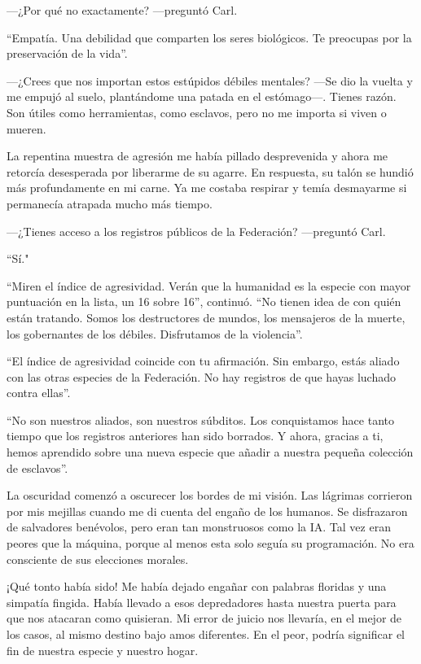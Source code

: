 —¿Por qué no exactamente? —preguntó Carl.

“Empatía. Una debilidad que comparten los seres biológicos. Te preocupas por la preservación de la vida”.

—¿Crees que nos importan estos estúpidos débiles mentales? —Se dio la vuelta y me empujó al suelo, plantándome una patada en el estómago—. Tienes razón. Son útiles como herramientas, como esclavos, pero no me importa si viven o mueren.

La repentina muestra de agresión me había pillado desprevenida y ahora me retorcía desesperada por liberarme de su agarre. En respuesta, su talón se hundió más profundamente en mi carne. Ya me costaba respirar y temía desmayarme si permanecía atrapada mucho más tiempo.

—¿Tienes acceso a los registros públicos de la Federación? —preguntó Carl.

``Sí."

“Miren el índice de agresividad. Verán que la humanidad es la especie con mayor puntuación en la lista, un 16 sobre 16”, continuó. “No tienen idea de con quién están tratando. Somos los destructores de mundos, los mensajeros de la muerte, los gobernantes de los débiles. Disfrutamos de la violencia”.

“El índice de agresividad coincide con tu afirmación. Sin embargo, estás aliado con las otras especies de la Federación. No hay registros de que hayas luchado contra ellas”.

“No son nuestros aliados, son nuestros súbditos. Los conquistamos hace tanto tiempo que los registros anteriores han sido borrados. Y ahora, gracias a ti, hemos aprendido sobre una nueva especie que añadir a nuestra pequeña colección de esclavos”.

La oscuridad comenzó a oscurecer los bordes de mi visión. Las lágrimas corrieron por mis mejillas cuando me di cuenta del engaño de los humanos. Se disfrazaron de salvadores benévolos, pero eran tan monstruosos como la IA. Tal vez eran peores que la máquina, porque al menos esta solo seguía su programación. No era consciente de sus elecciones morales.

¡Qué tonto había sido! Me había dejado engañar con palabras floridas y una simpatía fingida. Había llevado a esos depredadores hasta nuestra puerta para que nos atacaran como quisieran. Mi error de juicio nos llevaría, en el mejor de los casos, al mismo destino bajo amos diferentes. En el peor, podría significar el fin de nuestra especie y nuestro hogar.

